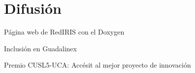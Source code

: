 

\section{Difusión}


Página web de RedIRIS con el Doxygen


Inclusión en Guadalinex

Premio CUSL5-UCA: Accésit al mejor proyecto de innovación


